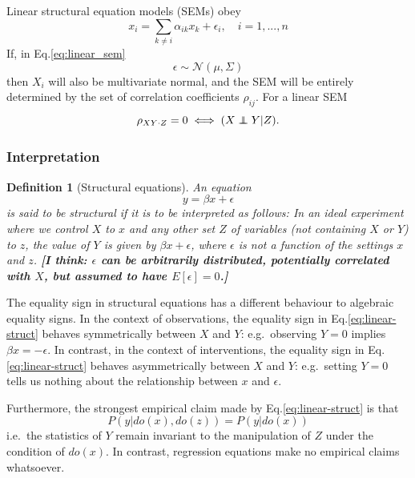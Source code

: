 \documentclass[11pt]{article}
\numberwithin{equation}{section}
\newcommand\indep{\protect\mathpalette{\protect\independenT}{\perp}}
\def\independenT#1#2{\mathrel{\rlap{$#1#2$}\mkern2mu{#1#2}}}
\newtheorem{defn}{Definition}[section]
\begin{document}
Linear structural equation models (SEMs) obey
\begin{equation}
x_i = \sum_{k \neq i} \alpha_{ik} x_k + \epsilon_i, \quad i=1,...,n  \label{eq:linear_sem}
\end{equation}
If, in Eq.\eqref{eq:linear_sem} 
\begin{equation}
\epsilon \sim \mathcal{N}(\mu, \Sigma)
\end{equation}
then $X_i$ will also be multivariate normal, and the SEM will be entirely determined by the set of correlation coefficients $\rho_{ij}$. For a linear SEM
\begin{equation}
\rho_{XY\cdot Z} = 0 \iff (X \indep Y | Z).
\end{equation}


\subsubsection{Interpretation}

\begin{defn}[Structural equations]
An equation 
\begin{equation}
y=\beta x + \epsilon \label{eq:linear-struct}
\end{equation}
is said to be structural if it is to be interpreted as follows: In an ideal experiment where we control $X$ to $x$ and any other set $Z$ of variables (not containing $X$ or $Y$) to $z$, the value of $Y$ is given by $\beta x + \epsilon$, where $\epsilon$ is not a function of the settings $x$ and $z$. \textbf{[I think: $\epsilon$ can be arbitrarily distributed, potentially correlated with $X$, but assumed to have $E[\epsilon]=0$.]}
\end{defn}

The equality sign in structural equations has a different behaviour to algebraic equality signs. In the context of observations, the equality sign in Eq.\eqref{eq:linear-struct} behaves symmetrically between $X$ and $Y$: e.g.\ observing $Y=0$ implies $\beta x = -\epsilon$. In contrast, in the context of interventions, the equality sign in Eq.\eqref{eq:linear-struct} behaves asymmetrically between $X$ and $Y$: e.g.\ setting $Y=0$ tells us nothing about the relationship between $x$ and $\epsilon$. 

Furthermore, the strongest empirical claim made by Eq.\eqref{eq:linear-struct} is that
\begin{equation}
P(y|do(x), do(z)) = P(y|do(x))
\end{equation}
i.e.\ the statistics of $Y$ remain invariant to the manipulation of $Z$ under the condition of $do(x)$. In contrast, regression equations make no empirical claims whatsoever.
\end{document}
